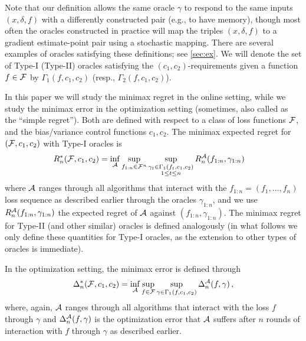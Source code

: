Note that our definition allows the same oracle $\gamma$ to respond to the same inputs $(x,\delta,f)$ with a differently constructed pair (e.g., to have memory), 
though most often the oracles constructed in practice 
will map the triples $(x,\delta,f)$ to a gradient estimate-point pair using a stochastic mapping.
There are several examples of oracles satisfying these definitions; see \cref{sec:ex}.
We will denote the set of Type-I (Type-II) oracles satisfying the $(c_1,c_2)$-requirements given a function $f\in \mathcal{F}$ by $\Gamma_1(f,c_1,c_2)$ (resp., $\Gamma_2(f,c_1,c_2)$). 

In this paper we will study the minimax regret in the online setting, while we study the minimax error in the optimization setting (sometimes, also called as the ``simple regret'').
Both are defined with respect to a class of loss functions $\mathcal{F}$, and the bias/variance control functions $c_1,c_2$.
The minimax expected regret for $(\mathcal{F},c_1,c_2)$ with Type-I oracles is
\begin{align}
R_n^*(\mathcal{F},c_1,c_2)
&= \inf_{\mathcal{A}} \sup_{f_{1:n}\in \mathcal{F}^n} 
	\sup_{\substack{\gamma_t \in \Gamma_1(f_t,c_1,c_2)\\1\le t \le n}} R_n^{\mathcal{A}}(f_{1:n},\gamma_{1:n})
\label{eq:minimaxregdef}
\end{align}
where $\mathcal{A}$ ranges through all algorithms that interact with the $f_{1:n}= (f_1,\dots,f_n)$ loss sequence
as described earlier
through the oracles $\gamma_{1:n}$,
and we use $R_n^{\mathcal{A}}(f_{1:n},\gamma_{1:n})$ the expected regret of $\mathcal{A}$ against $(f_{1:n},\gamma_{1:n})$.
The minimax regret for Type-II (and other similar) oracles is defined analogously (in what follows we only define these quantities for Type-I oracles, as the extension to other types of oracles is immediate).

In the optimization setting, the minimax error is defined through
\begin{align}
\label{eq:minimaxerrdef}
\Delta_n^*(\mathcal{F},c_1,c_2)
= \inf_{\mathcal{A}} \sup_{f \in \mathcal{F}} \sup_{\gamma\in \Gamma_1(f,c_1,c_2)}  \Delta_n^{\mathcal{A}}(f,\gamma)\,,
\end{align}
where, again, $\mathcal{A}$ ranges through all algorithms that interact with the loss $f$ through $\gamma$ and 
$\Delta_n^{\mathcal{A}}(f,\gamma)$ is the optimization error that $\mathcal{A}$ suffers 
after $n$ rounds of interaction with $f$ through $\gamma$ as described earlier.

